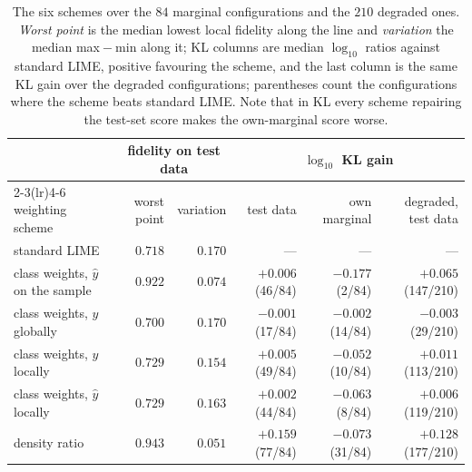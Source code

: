 \begin{table}[H]
  \centering
  \footnotesize
  \setlength{\tabcolsep}{5pt}
  \caption{The six schemes over the $84$ marginal configurations and the $210$ degraded ones. \emph{Worst point} is the median lowest local fidelity along the line and \emph{variation} the median max${}-{}$min along it; KL columns are median $\log_{10}$ ratios against standard LIME, positive favouring the scheme, and the last column is the same KL gain over the degraded configurations; parentheses count the configurations where the scheme beats standard LIME. Note that in KL every scheme repairing the test-set score makes the own-marginal score worse.}
  \label{tab:schemes}
  \begin{tabular}{lrrrrr}
    \toprule
    & \multicolumn{2}{c}{fidelity on test data} & \multicolumn{3}{c}{$\log_{10}$ KL gain} \\
    \cmidrule(lr){2-3}\cmidrule(lr){4-6}
    weighting scheme & worst point & variation & test data & own marginal & degraded, test data \\
    \midrule
    standard LIME & $0.718$ & $0.170$ & --- & --- & --- \\
    class weights, $\hat{y}$ on the sample & $0.922$ & $0.074$ & $+0.006$ (46/84) & $-0.177$ (2/84) & $+0.065$ (147/210) \\
    class weights, $y$ globally & $0.700$ & $0.170$ & $-0.001$ (17/84) & $-0.002$ (14/84) & $-0.003$ (29/210) \\
    class weights, $y$ locally & $0.729$ & $0.154$ & $+0.005$ (49/84) & $-0.052$ (10/84) & $+0.011$ (113/210) \\
    class weights, $\hat{y}$ locally & $0.729$ & $0.163$ & $+0.002$ (44/84) & $-0.063$ (8/84) & $+0.006$ (119/210) \\
    density ratio & $0.943$ & $0.051$ & $+0.159$ (77/84) & $-0.073$ (31/84) & $+0.128$ (177/210) \\
    \bottomrule
  \end{tabular}
\end{table}

